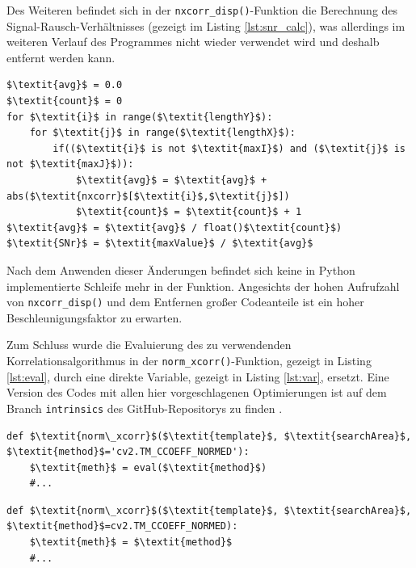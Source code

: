 \begin{sloppypar}
	Des Weiteren befindet sich in der \texttt{nxcorr\_disp()}-Funktion die Berechnung des Signal-Rausch-Verhältnisses (gezeigt im Listing \ref{lst:snr_calc}), was allerdings im weiteren Verlauf des Programmes nicht wieder verwendet wird und deshalb entfernt werden kann. 
\end{sloppypar}

\begin{lstlisting}[caption={Berechnung des Signal-Rausch-Verhältnisses}, label={lst:snr_calc}]
$\textit{avg}$ = 0.0
$\textit{count}$ = 0
for $\textit{i}$ in range($\textit{lengthY}$):
	for $\textit{j}$ in range($\textit{lengthX}$):
		if(($\textit{i}$ is not $\textit{maxI}$) and ($\textit{j}$ is not $\textit{maxJ}$)):
			$\textit{avg}$ = $\textit{avg}$ + abs($\textit{nxcorr}$[$\textit{i}$,$\textit{j}$])
			$\textit{count}$ = $\textit{count}$ + 1
$\textit{avg}$ = $\textit{avg}$ / float()$\textit{count}$)
$\textit{SNr}$ = $\textit{maxValue}$ / $\textit{avg}$
\end{lstlisting}

Nach dem Anwenden dieser Änderungen befindet sich keine in Python implementierte Schleife mehr in der Funktion. Angesichts der hohen Aufrufzahl von \texttt{nxcorr\_disp()} und dem Entfernen großer Codeanteile ist ein hoher Beschleunigungsfaktor zu erwarten. 

Zum Schluss wurde die Evaluierung des zu verwendenden Korrelationsalgorithmus in der \texttt{norm\_xcorr()}-Funktion, gezeigt in Listing \ref{lst:eval}, durch eine direkte Variable, gezeigt in Listing \ref{lst:var}, ersetzt. Eine Version des Codes mit allen hier vorgeschlagenen Optimierungen ist auf dem Branch \texttt{intrinsics} des GitHub-Repositorys zu finden \cite{Coj17}. 

\begin{lstlisting}[caption={Evaluierung der Korellationsmethode}, label={lst:eval}]
def $\textit{norm\_xcorr}$($\textit{template}$, $\textit{searchArea}$, $\textit{method}$='cv2.TM_CCOEFF_NORMED'):
	$\textit{meth}$ = eval($\textit{method}$)
	#...
\end{lstlisting}

\begin{lstlisting}[caption={Übergabe der Korellationsmethode als Variable}, label={lst:var}]
def $\textit{norm\_xcorr}$($\textit{template}$, $\textit{searchArea}$, $\textit{method}$=cv2.TM_CCOEFF_NORMED):
	$\textit{meth}$ = $\textit{method}$
	#...
\end{lstlisting}

